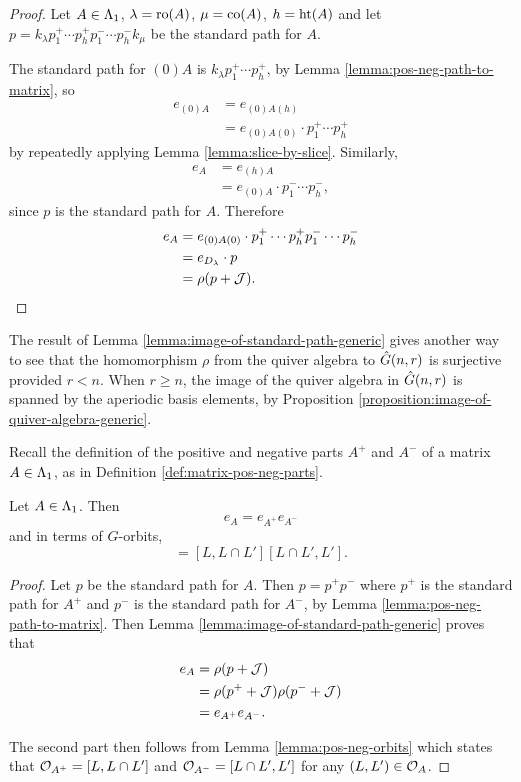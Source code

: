 \documentclass[a4paper, 11pt]{report}
\begin{document}
\begin{proof}
Let $A\in\Lambda_1{}$, $\lambda=\operatorname{ro}(A)$, $\mu=\operatorname{co}(A)$, $h=\operatorname{ht}(A)$ and let $p=k_\lambda p_1^+\cdots p_h^+ p_1^-\cdots p_h^- k_\mu$ be the standard path for $A$.

The standard path for $(0)A$ is $k_\lambda p_1^+\cdots p_h^+$, by Lemma \ref{lemma:pos-neg-path-to-matrix}, so
\begin{align*}
e_{(0)A}
&= e_{(0)A(h)}\\
&= e_{(0)A(0)}\cdot p_1^+\cdots p_h^+
\end{align*}
by repeatedly applying Lemma \ref{lemma:slice-by-slice}. Similarly,
\begin{align*}
e_A
&= e_{(h)A}\\
&= e_{(0)A}\cdot p_1^-\cdots p_h^-,
\end{align*}
since $p$ is the standard path for $A$. Therefore
\begin{align*}
e_A
&= e_{(0)A(0)}\cdot p_1^+\cdots p_h^+ p_1^-\cdots p_h^-\\
&= e_{D_{\lambda}}\cdot p\\
&= \rho(p+\mathcal{J}).
\end{align*}
\end{proof}

\begin{remark}
The result of Lemma \ref{lemma:image-of-standard-path-generic} gives another way to see that the homomorphism $\rho$ from the quiver algebra to $\hat{G}(n,r)$ is surjective provided $r<n$. When $r\geq n$, the image of the quiver algebra in $\hat{G}(n,r)$ is spanned by the aperiodic basis elements, by Proposition \ref{proposition:image-of-quiver-algebra-generic}.
\end{remark}

Recall the definition of the positive and negative parts $A^+$ and $A^-$ of a matrix $A\in\Lambda_1{}$, as in Definition \ref{def:matrix-pos-neg-parts}.

\begin{lemma}
Let $A\in\Lambda_1{}$. Then
\begin{equation*}
e_A = e_{A^+}e_{A^-}
\end{equation*}
and in terms of $G$-orbits,
\begin{equation*}
[L,L']=[L,L\cap L'][L\cap L',L'].
\end{equation*}
\end{lemma}

\begin{proof}
Let $p$ be the standard path for $A$. Then $p=p^+ p^-$ where $p^+$ is the standard path for $A^+$ and $p^-$ is the standard path for $A^-$, by Lemma \ref{lemma:pos-neg-path-to-matrix}. Then Lemma \ref{lemma:image-of-standard-path-generic} proves that
\begin{align*}
e_A
&= \rho(p+\mathcal{J})\\
&= \rho(p^+ +\mathcal{J})\rho(p^- +\mathcal{J})\\
&= e_{A^+}e_{A^-}.
\end{align*}

The second part then follows from Lemma \ref{lemma:pos-neg-orbits} which states that $\mathcal{O}_{A^+}=[L,L\cap L']$ and $\mathcal{O}_{A^-}=[L\cap L',L']$ for any $(L,L')\in\mathcal{O}_{A}$.
\end{proof}
\end{document}
